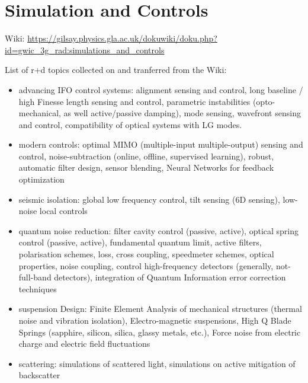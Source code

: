 \section{Simulation and Controls}
\label{sec:SimControls}
Wiki: \url{https://gilsay.physics.gla.ac.uk/dokuwiki/doku.php?id=gwic_3g_rad:simulations_and_controls}

List of r+d topics collected on and tranferred from the Wiki:
\begin{itemize}
\item advancing IFO control systems:  alignment sensing and control,
  long baseline / high Finesse length sensing and control,  parametric
  instabilities (opto-mechanical, as well active/passive damping),
  mode sensing, wavefront sensing and control, compatibility of
  optical systems with LG modes.
\item modern controls: optimal MIMO (multiple-input multiple-output)
  sensing and control, noise-subtraction (online, offline, supervised
  learning),  robust, automatic filter design, sensor blending, Neural
  Networks for feedback optimization
\item seismic isolation: global low frequency control, tilt sensing
  (6D sensing),  low-noise local controls
\item quantum noise reduction: filter cavity control (passive,
  active),  optical spring control (passive, active), fundamental
  quantum limit, active filters, polarisation schemes, loss, cross
  coupling, speedmeter schemes, optical properties, noise coupling,
  control high-frequency detectors (generally, not-full-band
  detectors), integration of Quantum Information error correction
  techniques
\item suspension Design: Finite Element Analysis of mechanical
  structures (thermal noise and vibration isolation), Electro-magnetic
  suspensions, High Q Blade Springs (sapphire, silicon, silica, glassy
  metals, etc.), Force noise from electric charge and electric field fluctuations
\item scattering: simulations of scattered light, simulations on
  active mitigation of backscatter
\end{itemize}


